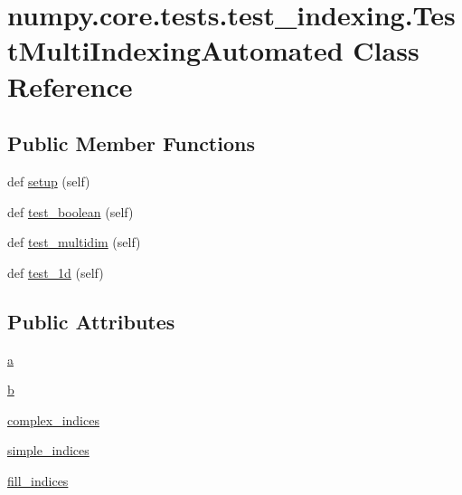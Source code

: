 \hypertarget{classnumpy_1_1core_1_1tests_1_1test__indexing_1_1TestMultiIndexingAutomated}{}\section{numpy.\+core.\+tests.\+test\+\_\+indexing.\+Test\+Multi\+Indexing\+Automated Class Reference}
\label{classnumpy_1_1core_1_1tests_1_1test__indexing_1_1TestMultiIndexingAutomated}
\subsection*{Public Member Functions}
\begin{DoxyCompactItemize}
\item 
def \hyperlink{classnumpy_1_1core_1_1tests_1_1test__indexing_1_1TestMultiIndexingAutomated_a8c5f355096c9aae6f677db5f7dc8bc92}{setup} (self)
\item 
def \hyperlink{classnumpy_1_1core_1_1tests_1_1test__indexing_1_1TestMultiIndexingAutomated_ae2145a2b695456a8f8c95964d48230e6}{test\+\_\+boolean} (self)
\item 
def \hyperlink{classnumpy_1_1core_1_1tests_1_1test__indexing_1_1TestMultiIndexingAutomated_a53fe97978c6cb5b56ab337919346635f}{test\+\_\+multidim} (self)
\item 
def \hyperlink{classnumpy_1_1core_1_1tests_1_1test__indexing_1_1TestMultiIndexingAutomated_ab5f38f06e7f114a08824a967e1c6d04f}{test\+\_\+1d} (self)
\end{DoxyCompactItemize}
\subsection*{Public Attributes}
\begin{DoxyCompactItemize}
\item 
\hyperlink{classnumpy_1_1core_1_1tests_1_1test__indexing_1_1TestMultiIndexingAutomated_a9b8cf096dcad6b41774ddefa30c70414}{a}
\item 
\hyperlink{classnumpy_1_1core_1_1tests_1_1test__indexing_1_1TestMultiIndexingAutomated_a878205ba5dd5b4f95cb4047f9e3be49b}{b}
\item 
\hyperlink{classnumpy_1_1core_1_1tests_1_1test__indexing_1_1TestMultiIndexingAutomated_a81a274e1e8a87850cd999b1e77924833}{complex\+\_\+indices}
\item 
\hyperlink{classnumpy_1_1core_1_1tests_1_1test__indexing_1_1TestMultiIndexingAutomated_aa5d0ef566c5f3b6025f6d7d2d0b1166e}{simple\+\_\+indices}
\item 
\hyperlink{classnumpy_1_1core_1_1tests_1_1test__indexing_1_1TestMultiIndexingAutomated_a02eb4baf53b4a71ff974dfd7f0681649}{fill\+\_\+indices}
\end{DoxyCompactItemize}


